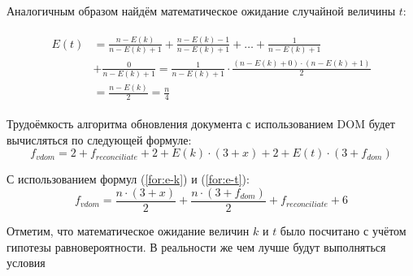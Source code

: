 Аналогичным образом найдём математическое ожидание случайной величины $t$:

\begin{align}
	\begin{split}
		\label{for:e-t}
		E(t) &= \frac{n - E(k)}{n - E(k) + 1} + \frac{n - E(k) - 1}{n - E(k) + 1} + \dotsc +  \frac{1}{n - E(k) + 1} \\
		&+\frac{0}{n - E(k) + 1} = \frac{1}{n - E(k) + 1} \cdot \frac{(n - E(k) + 0)\cdot(n - E(k) + 1)}{2}\\
		&= \frac{n - E(k)}{2} = \frac{n}{4}
	\end{split}
\end{align}

Трудоёмкость алгоритма обновления документа с использованием DOM будет вычисляться по следующей формуле:
\begin{equation}
	\label{for:f-vdom-1}
	f_{vdom} = 2 + f_{reconciliate} + 2 + E(k)\cdot(3 + x) + 2 + E(t)\cdot(3 + f_{dom})
\end{equation}

С использованием формул (\ref{for:e-k}) и (\ref{for:e-t}):
\begin{equation}
	\label{for:f-vdom-2}
	f_{vdom} = \frac{n \cdot (3 + x)}{2} + \frac{n\cdot(3 + f_{dom})}{2} + f_{reconciliate} + 6
\end{equation}

Отметим, что математическое ожидание величин $k$ и $t$ было посчитано с учётом гипотезы равновероятности.
В реальности же чем лучше будут выполняться условия 


\pagebreak